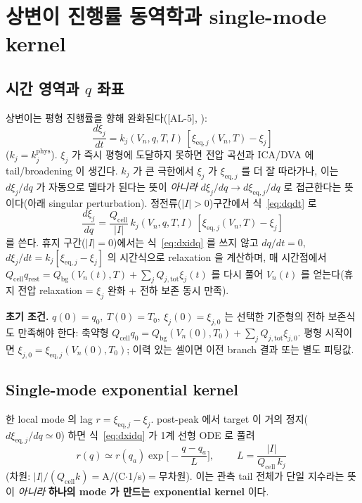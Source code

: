 \documentclass[11pt,a4paper]{article}
\newcommand{\eq}{\mathrm{eq}}
\newcommand{\tot}{\mathrm{tot}}
\newcommand{\bg}{\mathrm{bg}}
\newcommand{\cell}{\mathrm{cell}}
\newcommand{\AL}[1]{\textsf{[AL-#1]}}
\begin{document}
\section{상변이 진행률 동역학과 single-mode kernel}\label{sec:dyn}
\subsection{시간 영역과 $q$ 좌표}
상변이는 평형 진행률을 향해 완화된다(\AL{5}, \cite{onsager1931,degrootmazur1962}):
\begin{equation}
\boxed{\;\frac{d\xi_j}{dt}=k_j(V_n,q,T,I)\,[\xi_{\eq,j}(V_n,T)-\xi_j]\;}
\label{eq:dxidt}
\end{equation}
($k_j=k_j^\mathrm{phys}$). $\xi_j$ 가 즉시 평형에 도달하지 못하면 전압 곡선과 ICA/DVA 에 tail/broadening 이
생긴다. $k_j$ 가 큰 극한에서 $\xi_j$ 가 $\xi_{\eq,j}$ 를 더 잘 따라가나, 이는 $d\xi_j/dq$ 가 자동으로
델타가 된다는 뜻이 \emph{아니라} $d\xi_j/dq\to d\xi_{\eq,j}/dq$ 로 접근한다는 뜻이다(아래 singular
perturbation). 정전류($|I|>0$)구간에서 식~\eqref{eq:dqdt} 로
\begin{equation}
\boxed{\;\frac{d\xi_j}{dq}=\frac{Q_\cell}{|I|}\,k_j(V_n,q,T,I)\,[\xi_{\eq,j}(V_n,T)-\xi_j]\;}
\label{eq:dxidq}
\end{equation}
를 쓴다. 휴지 구간($|I|=0$)에서는 식~\eqref{eq:dxidq} 를 쓰지 않고 $dq/dt=0$, $d\xi_j/dt=k_j[\xi_{\eq,j}-\xi_j]$
의 시간식으로 relaxation 을 계산하며, 매 시간점에서 $Q_\cell q_\mathrm{rest}=Q_\bg(V_n(t),T)+\sum_j
Q_{j,\tot}\xi_j(t)$ 를 다시 풀어 $V_n(t)$ 를 얻는다(휴지 전압 relaxation = $\xi_j$ 완화 + 전하 보존 동시 만족).

\textbf{초기 조건.} $q(0)=q_0,\ T(0)=T_0,\ \xi_j(0)=\xi_{j,0}$ 는 선택한 기준형의 전하 보존식도 만족해야
한다: 축약형 $Q_\cell q_0=Q_\bg(V_n(0),T_0)+\sum_j Q_{j,\tot}\xi_{j,0}$. 평형 시작이면
$\xi_{j,0}=\xi_{\eq,j}(V_n(0),T_0)$; 이력 있는 셀이면 이전 branch 결과 또는 별도 피팅값.

\subsection{Single-mode exponential kernel}\label{sec:singlemode}
한 local mode 의 lag $r=\xi_{\eq,j}-\xi_j$. post-peak 에서 target 이 거의 정지($d\xi_{\eq,j}/dq\simeq0$)
하면 식~\eqref{eq:dxidq} 가 1계 선형 ODE 로 풀려
\begin{equation}
r(q)\simeq r(q_a)\exp\!\Big[-\frac{q-q_a}{L}\Big],\qquad \boxed{\;L=\frac{|I|}{Q_\cell\,k_j}\;}
\label{eq:single_kernel}
\end{equation}
(차원: $|I|/(Q_\cell k)=$A$/$(C$\cdot$1/s)$=$무차원). 이는 관측 tail 전체가 단일 지수라는 뜻이 \emph{아니라}
\textbf{하나의 mode 가 만드는 exponential kernel} 이다.
\end{document}
